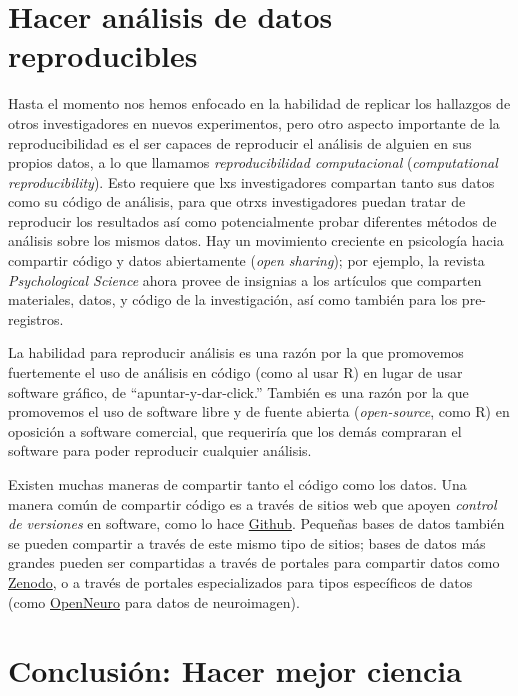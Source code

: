\documentclass[
  12pt,
]{book}
\begin{document}
\hypertarget{hacer-anuxe1lisis-de-datos-reproducibles}{%
\section{Hacer análisis de datos reproducibles}\label{hacer-anuxe1lisis-de-datos-reproducibles}}

Hasta el momento nos hemos enfocado en la habilidad de replicar los hallazgos de otros investigadores en nuevos experimentos, pero otro aspecto importante de la reproducibilidad es el ser capaces de reproducir el análisis de alguien en sus propios datos, a lo que llamamos \emph{reproducibilidad computacional} (\emph{computational reproducibility}). Esto requiere que lxs investigadores compartan tanto sus datos como su código de análisis, para que otrxs investigadores puedan tratar de reproducir los resultados así como potencialmente probar diferentes métodos de análisis sobre los mismos datos. Hay un movimiento creciente en psicología hacia compartir código y datos abiertamente (\emph{open sharing}); por ejemplo, la revista \emph{Psychological Science} ahora provee de insignias a los artículos que comparten materiales, datos, y código de la investigación, así como también para los pre-registros.

La habilidad para reproducir análisis es una razón por la que promovemos fuertemente el uso de análisis en código (como al usar R) en lugar de usar software gráfico, de ``apuntar-y-dar-click.'' También es una razón por la que promovemos el uso de software libre y de fuente abierta (\emph{open-source}, como R) en oposición a software comercial, que requeriría que los demás compraran el software para poder reproducir cualquier análisis.

Existen muchas maneras de compartir tanto el código como los datos. Una manera común de compartir código es a través de sitios web que apoyen \emph{control de versiones} en software, como lo hace \href{http://github.com}{Github}. Pequeñas bases de datos también se pueden compartir a través de este mismo tipo de sitios; bases de datos más grandes pueden ser compartidas a través de portales para compartir datos como \href{https://zenodo.org/}{Zenodo}, o a través de portales especializados para tipos específicos de datos (como \href{http://openneuro.org}{OpenNeuro} para datos de neuroimagen).

\hypertarget{conclusiuxf3n-hacer-mejor-ciencia}{%
\section{Conclusión: Hacer mejor ciencia}\label{conclusiuxf3n-hacer-mejor-ciencia}}
\end{document}
